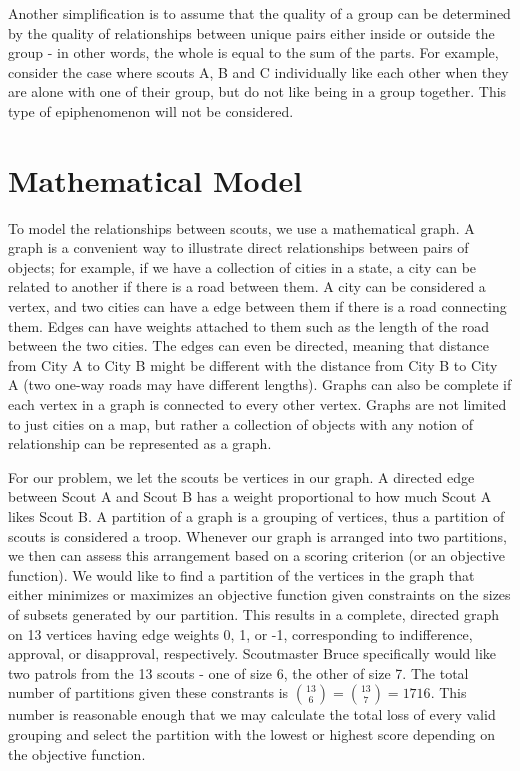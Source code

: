 \documentclass{amsart}
\theoremstyle{definition}
\theoremstyle{remark}
\numberwithin{equation}{section}
\begin{document}
Another simplification is to assume that the quality of a group can be determined by the quality of relationships between unique pairs either inside or outside the group - in other words, the whole is equal to the sum of the parts. For example, consider the case where scouts A, B and C individually like each other when they are alone with one of their group, but do not like being in a group together. This type of epiphenomenon will not be considered.

\section*{Mathematical Model}
To model the relationships between scouts, we use a mathematical graph. A graph is a convenient way to illustrate direct relationships between pairs of objects; for example, if we have a collection of cities in a state, a city can be related to another if there is a road between them. A city can be considered a vertex, and two cities can have a edge between them if there is a road connecting them. Edges can have weights attached to them such as the length of the road between the two cities. The edges can even be directed, meaning that distance from City A to City B might be different with the distance from City B to City A (two one-way roads may have different lengths). Graphs can also be complete if each vertex in a graph is connected to every other vertex. Graphs are not limited to just cities on a map, but rather a collection of objects with any notion of relationship can be represented as a graph.

For our problem, we let the scouts be vertices in our graph. A directed edge between Scout A and Scout B has a weight proportional to how much Scout A likes Scout B. A partition of a graph is a grouping of vertices, thus a partition of scouts is considered a troop. Whenever our graph is arranged into two partitions, we then can assess this arrangement based on a scoring criterion (or an objective function). We would like to find a partition of the vertices in the graph that either minimizes or maximizes an objective function given constraints on the sizes of subsets generated by our partition. This results in a complete, directed graph on 13 vertices having edge weights 0, 1, or -1, corresponding to indifference, approval, or disapproval, respectively. Scoutmaster Bruce specifically would like two patrols from the 13 scouts - one of size 6, the other of size 7. The total number of partitions given these constrants is $\binom{13}{6} = \binom{13}{7} = 1716$. This number is reasonable enough that we may calculate the total loss of every valid grouping and select the partition with the lowest or highest score depending on the objective function.
\end{document}
